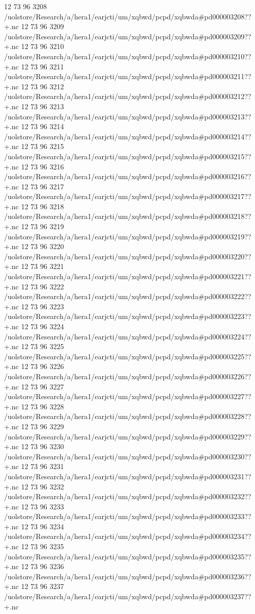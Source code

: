 12 73 96
3208
/uolstore/Research/a/hera1/earjcti/um/xqbwd/pcpd/xqbwda#pd000003208??+.nc
12 73 96
3209
/uolstore/Research/a/hera1/earjcti/um/xqbwd/pcpd/xqbwda#pd000003209??+.nc
12 73 96
3210
/uolstore/Research/a/hera1/earjcti/um/xqbwd/pcpd/xqbwda#pd000003210??+.nc
12 73 96
3211
/uolstore/Research/a/hera1/earjcti/um/xqbwd/pcpd/xqbwda#pd000003211??+.nc
12 73 96
3212
/uolstore/Research/a/hera1/earjcti/um/xqbwd/pcpd/xqbwda#pd000003212??+.nc
12 73 96
3213
/uolstore/Research/a/hera1/earjcti/um/xqbwd/pcpd/xqbwda#pd000003213??+.nc
12 73 96
3214
/uolstore/Research/a/hera1/earjcti/um/xqbwd/pcpd/xqbwda#pd000003214??+.nc
12 73 96
3215
/uolstore/Research/a/hera1/earjcti/um/xqbwd/pcpd/xqbwda#pd000003215??+.nc
12 73 96
3216
/uolstore/Research/a/hera1/earjcti/um/xqbwd/pcpd/xqbwda#pd000003216??+.nc
12 73 96
3217
/uolstore/Research/a/hera1/earjcti/um/xqbwd/pcpd/xqbwda#pd000003217??+.nc
12 73 96
3218
/uolstore/Research/a/hera1/earjcti/um/xqbwd/pcpd/xqbwda#pd000003218??+.nc
12 73 96
3219
/uolstore/Research/a/hera1/earjcti/um/xqbwd/pcpd/xqbwda#pd000003219??+.nc
12 73 96
3220
/uolstore/Research/a/hera1/earjcti/um/xqbwd/pcpd/xqbwda#pd000003220??+.nc
12 73 96
3221
/uolstore/Research/a/hera1/earjcti/um/xqbwd/pcpd/xqbwda#pd000003221??+.nc
12 73 96
3222
/uolstore/Research/a/hera1/earjcti/um/xqbwd/pcpd/xqbwda#pd000003222??+.nc
12 73 96
3223
/uolstore/Research/a/hera1/earjcti/um/xqbwd/pcpd/xqbwda#pd000003223??+.nc
12 73 96
3224
/uolstore/Research/a/hera1/earjcti/um/xqbwd/pcpd/xqbwda#pd000003224??+.nc
12 73 96
3225
/uolstore/Research/a/hera1/earjcti/um/xqbwd/pcpd/xqbwda#pd000003225??+.nc
12 73 96
3226
/uolstore/Research/a/hera1/earjcti/um/xqbwd/pcpd/xqbwda#pd000003226??+.nc
12 73 96
3227
/uolstore/Research/a/hera1/earjcti/um/xqbwd/pcpd/xqbwda#pd000003227??+.nc
12 73 96
3228
/uolstore/Research/a/hera1/earjcti/um/xqbwd/pcpd/xqbwda#pd000003228??+.nc
12 73 96
3229
/uolstore/Research/a/hera1/earjcti/um/xqbwd/pcpd/xqbwda#pd000003229??+.nc
12 73 96
3230
/uolstore/Research/a/hera1/earjcti/um/xqbwd/pcpd/xqbwda#pd000003230??+.nc
12 73 96
3231
/uolstore/Research/a/hera1/earjcti/um/xqbwd/pcpd/xqbwda#pd000003231??+.nc
12 73 96
3232
/uolstore/Research/a/hera1/earjcti/um/xqbwd/pcpd/xqbwda#pd000003232??+.nc
12 73 96
3233
/uolstore/Research/a/hera1/earjcti/um/xqbwd/pcpd/xqbwda#pd000003233??+.nc
12 73 96
3234
/uolstore/Research/a/hera1/earjcti/um/xqbwd/pcpd/xqbwda#pd000003234??+.nc
12 73 96
3235
/uolstore/Research/a/hera1/earjcti/um/xqbwd/pcpd/xqbwda#pd000003235??+.nc
12 73 96
3236
/uolstore/Research/a/hera1/earjcti/um/xqbwd/pcpd/xqbwda#pd000003236??+.nc
12 73 96
3237
/uolstore/Research/a/hera1/earjcti/um/xqbwd/pcpd/xqbwda#pd000003237??+.nc
